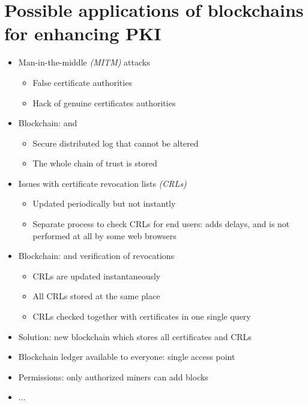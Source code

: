 \section[Blockchains for PKI]{Possible applications of blockchains for enhancing PKI}


\begin{frame}
\begin{itemize}
\item Man-in-the-middle \emph{(MITM)} attacks
\begin{itemize}
\item False certificate authorities
\item Hack of genuine certificates authorities
\end{itemize}
\vspace{2mm}
\item Blockchain:  and 
\begin{itemize}
\item Secure distributed log that cannot be altered
\item The whole chain of trust is stored
\end{itemize}
\end{itemize}
\end{frame}

\begin{frame}
\begin{itemize}
\item Issues with certificate revocation lists \emph{(CRLs)}
\begin{itemize}
\item Updated periodically but not instantly
\item Separate process to check CRLs for end users: adds delays, and is not performed at all by some web browsers
\end{itemize}
\vspace{2mm}
\item Blockchain:  and  verification of revocations
\begin{itemize}
\item CRLs are updated instantaneously
\item All CRLs stored at the same place
\item CRLs checked together with certificates in one single query
\end{itemize}
\end{itemize}
\end{frame}

\begin{frame}
\begin{itemize}
\item Solution: new blockchain which stores all certificates and CRLs
\item Blockchain ledger available to everyone: single access point
\item Permissions: only authorized miners can add blocks
\item ...


\end{itemize}
\end{frame}

